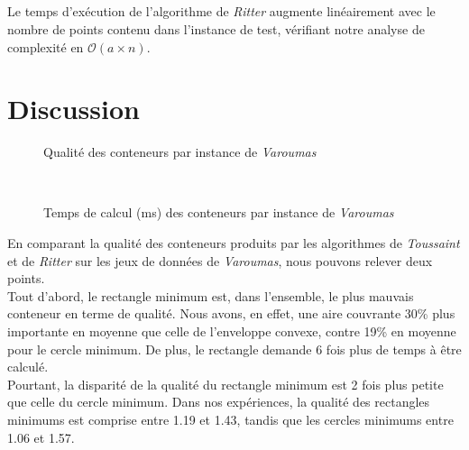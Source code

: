 \documentclass[a4paper, 12pt]{report}
\newcommand{\bigO}{\mathcal{O}}
\begin{document}
\paragraph{}
Le temps d’exécution de l'algorithme de \emph{Ritter} augmente linéairement avec le nombre de points contenu dans l'instance de test, vérifiant notre analyse de complexité en $\bigO(a \times n)$.


\chapter{Discussion}
\begin{figure}[htbp]

\centering
\begin{minipage}[t]{0.47
\textwidth}
\def\svgscale{0.45}

\caption{Qualité des conteneurs par instance de \emph{Varoumas}}
\end{minipage}
\hfill
\begin{minipage}[t]{0.47\textwidth}
   \
\def\svgscale{0.45}

\caption{Temps de calcul (ms) des conteneurs par instance de \emph{Varoumas}}
\end{minipage}
\end{figure}
En comparant la qualité des conteneurs produits par les algorithmes de \emph{Toussaint} et de \emph{Ritter} sur les jeux de données de \emph{Varoumas}, nous pouvons relever deux points. \\
Tout d'abord, le rectangle minimum est, dans l'ensemble, le plus mauvais conteneur en terme de qualité. Nous avons, en effet, une aire couvrante 30\% plus importante en moyenne que celle de l'enveloppe convexe, contre 19\% en moyenne pour le cercle minimum. De plus, le rectangle demande 6 fois plus de temps à être calculé. \\ Pourtant, la disparité de la qualité du rectangle minimum est 2 fois plus petite que celle du cercle minimum. Dans nos expériences, la qualité des rectangles minimums est comprise entre 1.19 et 1.43, tandis que les cercles minimums entre 1.06 et 1.57.
\end{document}
